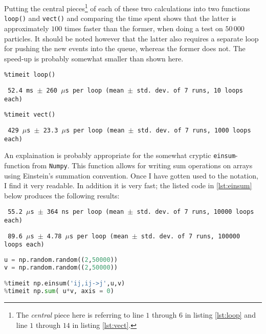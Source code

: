 Putting the central pieces\footnote{The \textit{central} piece here is referring to line $1$ through $6$ in listing \ref{lst:loop} and line $1$ through $14$ in listing \ref{lst:vect}.} of each of these two calculations into two functions \texttt{loop()} and \texttt{vect()} and comparing the time spent shows that the latter is approximately $100$ times faster than the former, when doing a test on $50\,000$ particles. It should be noted however that the latter also requires a separate loop for pushing the new events into the queue, whereas the former does not. The speed-up is probably somewhat smaller than shown here.

\begin{lstlisting}
%timeit loop()
\end{lstlisting}
\texttt{\small
52.4 ms $\pm$ 260 $\mu$s per loop (mean $\pm$ std. dev. of 7 runs, 10 loops each)
}

\begin{lstlisting}
%timeit vect()
\end{lstlisting}
\texttt{\small
429 $\mu$s $\pm$ 23.3 $\mu$s per loop (mean $\pm$ std. dev. of 7 runs, 1000 loops each)
}


An explaination is probably appropriate for the somewhat cryptic \texttt{einsum}-function from \texttt{Numpy}. This function allows for writing sum operations on arrays using Einstein's summation convention. Once I have gotten used to the notation, I find it very readable. In addition it is very fast; the listed code in \ref{lst:einsum} below produces the following results: 

\texttt{\small
55.2 $\mu$s $\pm$ 364 ns per loop (mean $\pm$ std. dev. of 7 runs, 10000 loops each)
}

\texttt{\small 
89.6 $\mu$s $\pm$ 4.78 $\mu$s per loop (mean $\pm$ std. dev. of 7 runs, 100000 loops each)
}
\begin{lstlisting}[language=Python,label={lst:einsum}]
u = np.random.random((2,50000))
v = np.random.random((2,50000))

%timeit np.einsum('ij,ij->j',u,v)
%timeit np.sum( u*v, axis = 0)
\end{lstlisting}